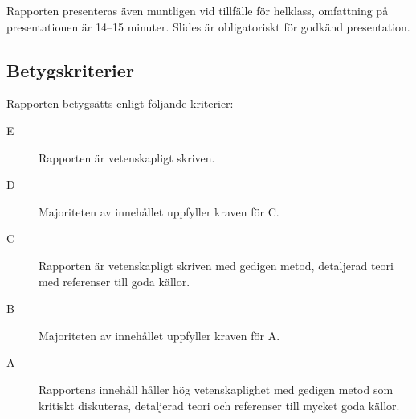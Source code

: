 \documentclass[a4paper]{miunasgn}
\begin{document}
Rapporten presenteras även muntligen vid tillfälle för helklass, omfattning på 
presentationen är 14--15 minuter.
Slides är obligatoriskt för godkänd presentation.

\subsection{Betygskriterier}

Rapporten betygsätts enligt följande kriterier:
\begin{description}
  \item[E] Rapporten är vetenskapligt skriven.
  \item[D] Majoriteten av innehållet uppfyller kraven för C.
  \item[C] Rapporten är vetenskapligt skriven med gedigen metod, detaljerad 
    teori med referenser till goda källor.
  \item[B] Majoriteten av innehållet uppfyller kraven för A.
  \item[A] Rapportens innehåll håller hög vetenskaplighet med gedigen metod som 
    kritiskt diskuteras, detaljerad teori och referenser till mycket goda 
    källor.
\end{description}


\printbibliography
\end{document}
